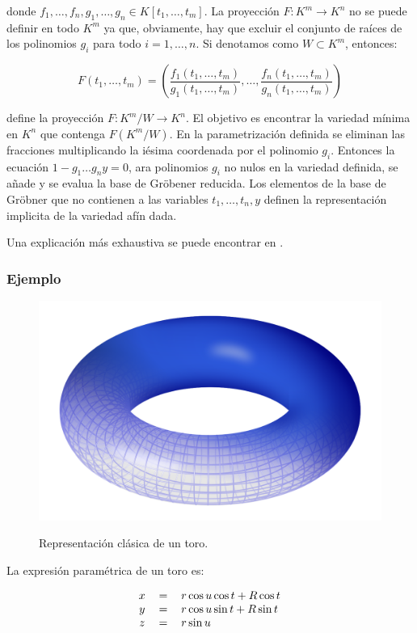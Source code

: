 donde $f_1, \dotso, f_n, g_1, \dotso, g_n \in K[t_1, \dotso, t_m]$. La proyección $F : K^m \to K^n$ no se puede definir en todo $K^m$ ya que, obviamente, hay que excluir el conjunto de raíces de los polinomios $g_i$ para todo $i = 1, \dotso, n$. Si denotamos como $W \subset K^m$, entonces:

$$F(t_1, \dotso, t_m) = \left( \frac{f_1(t_1, \dotso, t_m)}{g_1(t_1, \dotso, t_m)}, \dotso, \frac{f_n(t_1, \dotso, t_m)}{g_n(t_1, \dotso, t_m)}  \right)$$

define la proyección $F : K^m / W \to K^n $. El objetivo es encontrar la variedad mínima en $K^n$ que contenga $F(K^m / W)$. En la parametrización definida se eliminan las fracciones multiplicando la iésima coordenada por el polinomio $g_i$. Entonces la ecuación $1 - g_1 \dotso g_n y = 0$, ara polinomios $g_i$ no nulos en la variedad definida, se añade  y se evalua la base de Gröbener reducida. Los elementos de la base de Gröbner que no contienen a las variables $t_1, \dotso, t_n, y$ definen la representación implicita de la variedad afín dada.
\par
Una explicación más exhaustiva se puede encontrar en \cite{Hoffmann93}.
\subsubsection*{Ejemplo}

\begin{figure}[h]
\centering
\includegraphics[width=0.5\linewidth]{images/Torus.png}
\caption{Representación clásica de un toro.}\cite{Wikipedia:Torus}
\end{figure}

La expresión paramétrica de un toro es:

\begin{equation}
\begin{tabular}{c c l}
$x$ & $=$ & $r \cos u \cos t + R \cos t$ \\
$y$ & $=$ & $r \cos u \sin t + R \sin t$ \\
$z$ & $=$ & $r \sin u$
\end{tabular}
\nonumber
\end{equation}

